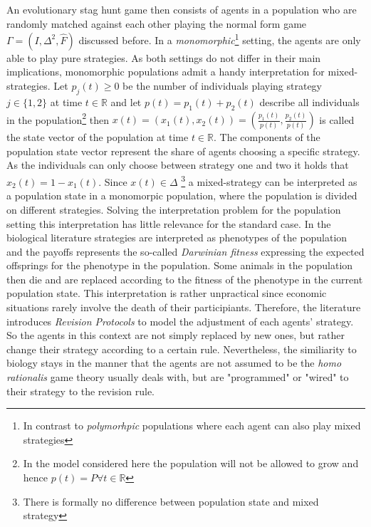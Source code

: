 \documentclass[12pt]{article}
\newcommand{\realnumb}{\mathbb{R}}
\begin{document}
An evolutionary stag hunt game then consists of agents in a population who
are randomly matched against each other playing the normal form game 
$\Gamma = (I,\Delta^2,\hat{F})$ discussed before. In a \textit{monomorphic}\footnote{In 
contrast to \textit{polymorhpic} populations where each agent can also 
play mixed strategies} setting, the agents are only able to play pure 
strategies. As both settings do not differ in their main implications, 
monomorphic populations admit a handy interpretation for mixed-strategies.
Let $p_j(t) \geq 0$ be the number of individuals playing strategy $j \in \{1,2\}$
at time $t \in \realnumb$ and let $p(t) = p_1(t) + p_2(t)$ describe all individuals 
in the population\footnote{In the model considered here the population will 
not be allowed to grow and hence $p(t) = P \forall t \in \realnumb$}
then $x(t) = \left(x_1(t),x_2(t)\right)=\left(\frac{p_1(t)}{p(t)},\frac{p_2(t)}{p(t)}\right)$ is called the state vector of the population at
time $t \in \realnumb$. The components of the population state vector represent
the share of agents choosing a specific strategy. 
As the individuals can only choose between strategy one and two it holds that 
$x_2(t) = 1-x_1(t)$. Since $x(t) \in \Delta$ \footnote{There is formally no
difference between population state and mixed strategy} a mixed-strategy can 
be interpreted as a population state in a monomorpic population, where the 
population is divided on different strategies. Solving the interpretation
problem for the population setting this interpretation has little relevance
for the standard case. 
In the biological literature\cite{maynard} strategies are interpreted as
phenotypes of the population and the payoffs represents the so-called 
\textit{Darwinian fitness} expressing the expected offsprings for the phenotype
in the population. Some animals in the population then die and are replaced
according to the fitness of the phenotype in the current population
state. 
This interpretation is rather unpractical since economic situations rarely
involve the death of their participiants. Therefore, the literature introduces
\textit{Revision Protocols} to model the adjustment of each agents' strategy.
So the agents in this context are not simply replaced by new ones, but rather
change their strategy according to a certain rule. Nevertheless, the
similiarity to biology stays in the manner that the agents are not
assumed to be the \textit{homo rationalis} game theory usually deals with, but
are "programmed" or "wired" \cite{gintis} to their strategy to the revision rule.
\end{document}
